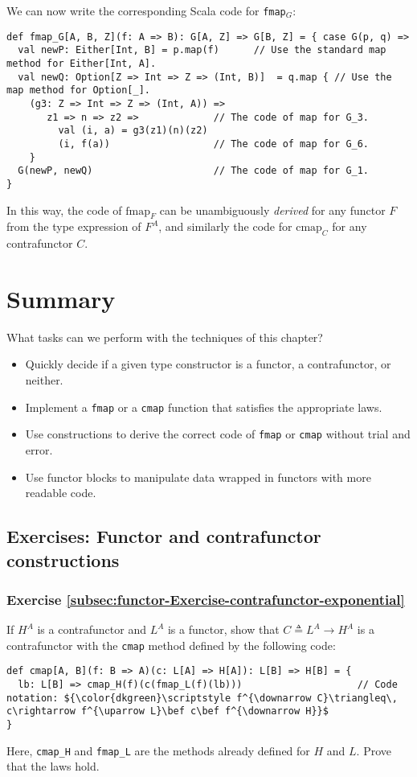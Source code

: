 We can now write the corresponding Scala code for \lstinline!fmap!$_{G}$:
\begin{lstlisting}
def fmap_G[A, B, Z](f: A => B): G[A, Z] => G[B, Z] = { case G(p, q) =>
  val newP: Either[Int, B] = p.map(f)      // Use the standard map method for Either[Int, A].
  val newQ: Option[Z => Int => Z => (Int, B)]  = q.map { // Use the map method for Option[_].
    (g3: Z => Int => Z => (Int, A)) => 
       z1 => n => z2 =>             // The code of map for G_3.
         val (i, a) = g3(z1)(n)(z2)
         (i, f(a))                  // The code of map for G_6.
    }
  G(newP, newQ)                     // The code of map for G_1.
}
\end{lstlisting}
In this way, the code of $\text{fmap}_{F}$ can be unambiguously \emph{derived}
for any functor $F$ from the type expression of $F^{A}$, and similarly
the code for $\text{cmap}_{C}$ for any contrafunctor $C$.

\section{Summary}

What tasks can we perform with the techniques of this chapter?
\begin{itemize}
\item Quickly decide if a given type constructor is a functor, a contrafunctor,
or neither.
\item Implement a \lstinline!fmap! or a \lstinline!cmap! function that
satisfies the appropriate laws.
\item Use constructions to derive the correct code of \lstinline!fmap!
or \lstinline!cmap! without trial and error.
\item Use functor blocks to manipulate data wrapped in functors with more
readable code.
\end{itemize}

\subsection{Exercises: Functor and contrafunctor constructions }

\subsubsection{Exercise \label{subsec:functor-Exercise-contrafunctor-exponential}\ref{subsec:functor-Exercise-contrafunctor-exponential}}

If $H^{A}$ is a contrafunctor and $L^{A}$ is a functor, show that
$C\triangleq L^{A}\rightarrow H^{A}$ is a contrafunctor with the
\lstinline!cmap! method defined by the following code:
\begin{lstlisting}[mathescape=true]
def cmap[A, B](f: B => A)(c: L[A] => H[A]): L[B] => H[B] = {
  lb: L[B] => cmap_H(f)(c(fmap_L(f)(lb)))                    // Code notation: ${\color{dkgreen}\scriptstyle f^{\downarrow C}\triangleq\, c\rightarrow f^{\uparrow L}\bef c\bef f^{\downarrow H}}$
}
\end{lstlisting}
Here, \lstinline!cmap_H! and \lstinline!fmap_L! are the methods
already defined for $H$ and $L$. Prove that the laws hold.

